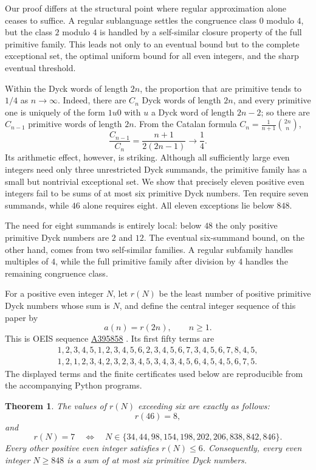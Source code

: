 \documentclass[12pt]{article}
\theoremstyle{plain}
\newtheorem{theorem}{Theorem}
\newcommand{\seqnum}[1]{\href{https://oeis.org/#1}{\rm \underline{#1}}}
\begin{document}
Our proof differs at the structural point where regular approximation
alone ceases to suffice.  A regular sublanguage settles the congruence
class $0$ modulo $4$, but the class $2$ modulo $4$ is handled by a
self-similar closure property of the full primitive family.  This leads
not only to an eventual bound but to the complete exceptional set, the
optimal uniform bound for all even integers, and the sharp eventual
threshold.

Within the Dyck words of length $2n$, the proportion that are primitive
tends to $1/4$ as $n\to\infty$.  Indeed, there are $C_n$ Dyck words of
length $2n$, and every primitive one is uniquely of the form $1u0$ with
$u$ a Dyck word of length $2n-2$; so there are $C_{n-1}$ primitive words
of length $2n$.  From the Catalan formula
$C_n=\frac1{n+1}\binom{2n}{n}$,
\[
 \frac{C_{n-1}}{C_n}=\frac{n+1}{2(2n-1)}\longrightarrow\frac14 .
\]
Its arithmetic effect, however, is striking.  Although all sufficiently
large even integers need only three unrestricted Dyck summands, the
primitive family has a small but nontrivial exceptional set.  We show
that precisely eleven positive even integers fail to be sums of at most
six primitive Dyck numbers.  Ten require seven summands, while $46$
alone requires eight.  All eleven exceptions lie below $848$.

The need for eight summands is entirely local: below $48$ the only
positive primitive Dyck numbers are $2$ and $12$.  The eventual
six-summand bound, on the other hand, comes from two self-similar
families.  A regular subfamily handles multiples of $4$, while the full
primitive family after division by $4$ handles the remaining congruence
class.

For a positive even integer $N$, let $r(N)$ be the least number of
positive primitive Dyck numbers whose sum is $N$, and define the central
integer sequence of this paper by
\[
        a(n)=r(2n),\qquad n\geq1.
\]
This is OEIS sequence \seqnum{A395858} \cite{OEIS-A395858}.
Its first fifty terms are
\[
\begin{gathered}
1,2,3,4,5,1,2,3,4,5,6,2,3,4,5,6,7,3,4,5,6,7,8,4,5,\\
1,2,1,2,3,4,2,3,2,3,4,5,3,4,3,4,5,6,4,5,4,5,6,7,5.
\end{gathered}
\]
The displayed terms and the finite certificates used below are
reproducible from the accompanying Python programs.

\begin{theorem}\label{thm:main}
The values of $r(N)$ exceeding six are exactly as follows:
\[
 r(46)=8,
\]
and
\[
 r(N)=7
 \quad\Longleftrightarrow\quad
 N\in\{34,44,98,154,198,202,206,838,842,846\}.
\]
Every other positive even integer satisfies $r(N)\leq6$.  Consequently,
every even integer $N\geq848$ is a sum of at most six primitive Dyck
numbers.
\end{theorem}
\end{document}
